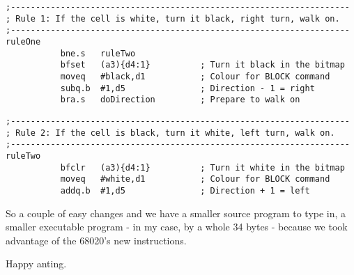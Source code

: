 \begin{lstlisting}[firstnumber=293,caption={Langtons Ant - 68020 Rule 1}]
;--------------------------------------------------------------------
; Rule 1: If the cell is white, turn it black, right turn, walk on.
;--------------------------------------------------------------------
ruleOne
           bne.s   ruleTwo
           bfset   (a3){d4:1}          ; Turn it black in the bitmap
           moveq   #black,d1           ; Colour for BLOCK command
           subq.b  #1,d5               ; Direction - 1 = right
           bra.s   doDirection         ; Prepare to walk on

\end{lstlisting}



\begin{lstlisting}[firstnumber=303,caption={Langtons Ant - 68020 Rule 2}]
;--------------------------------------------------------------------
; Rule 2: If the cell is black, turn it white, left turn, walk on.
;--------------------------------------------------------------------
ruleTwo
           bfclr   (a3){d4:1}          ; Turn it white in the bitmap
           moveq   #white,d1           ; Colour for BLOCK command
           addq.b  #1,d5               ; Direction + 1 = left

\end{lstlisting}

So a couple of easy changes and we have a smaller source program to type in, a smaller executable program - in my case, by a whole 34 bytes - because we took advantage of the 68020's new instructions.

Happy anting.